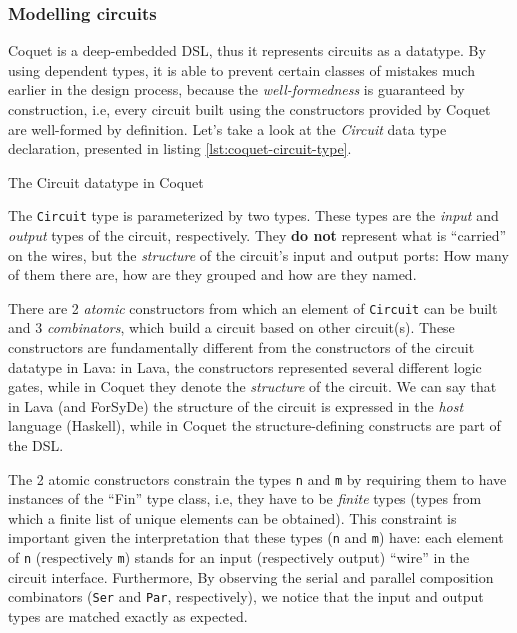         \subsubsection{Modelling circuits}
        \label{subsubsec:coquet-modelling}
            Coquet is a deep-embedded DSL, thus it represents circuits as a datatype. By using
            dependent types, it is able to prevent certain classes of mistakes much earlier in the
            design process, because the \emph{well-formedness} is guaranteed by construction, i.e,
            every circuit built using the constructors provided by Coquet are well-formed by
            definition. Let's take a look at the \emph{Circuit} data type declaration, presented in
            listing \ref{lst:coquet-circuit-type}.

            \begin{listing}[h!]
                \caption{The Circuit datatype in Coquet
                    \label{lst:coquet-circuit-type}}
            \end{listing}

            The \texttt{Circuit} type is parameterized by two types. These types are the
            \emph{input} and \emph{output} types of the circuit, respectively. They \textbf{do not}
            represent what is ``carried'' on the wires, but the \emph{structure} of the circuit's
            input and output ports: How many of them there are, how are they grouped and how are
            they named.

            There are 2 \emph{atomic} constructors from which an element of \texttt{Circuit} can be
            built and 3 \emph{combinators}, which build a circuit based on other circuit(s).  These
            constructors are fundamentally different from the constructors of the circuit datatype
            in Lava: in Lava, the constructors represented several different logic gates, while in
            Coquet they denote the \emph{structure} of the circuit. We can say that in Lava (and
            ForSyDe) the structure of the circuit is expressed in the \emph{host} language
            (Haskell), while in Coquet the structure-defining constructs are part of the DSL.

            The 2 atomic constructors constrain the types \texttt{n} and \texttt{m} by requiring
            them to have instances of the ``Fin'' type class, i.e, they have to be \emph{finite}
            types (types from which a finite list of unique elements can be obtained). This
            constraint is important given the interpretation that these types (\texttt{n} and
            \texttt{m}) have: each element of \texttt{n} (respectively \texttt{m}) stands for an
            input (respectively output) ``wire'' in the circuit interface. Furthermore, By observing
            the serial and parallel composition combinators (\texttt{Ser} and \texttt{Par},
            respectively), we notice that the input and output types are matched exactly as
            expected.

